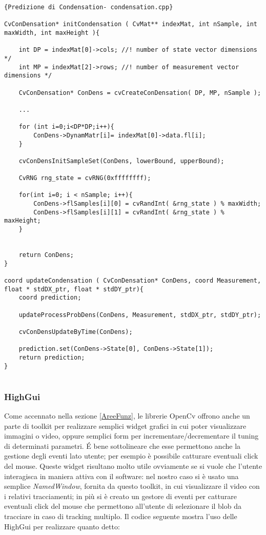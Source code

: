 \lstset{language=c++}
\lstset{commentstyle=\emph}
\begin{lstlisting}[frame=r,caption=Predizione di Condensation- condensation.cpp ,breaklines=true,basicstyle=\small]{Predizione di Condensation- condensation.cpp}

CvConDensation* initCondensation ( CvMat** indexMat, int nSample, int maxWidth, int maxHeight ){
	
	int DP = indexMat[0]->cols; //! number of state vector dimensions */
	int MP = indexMat[2]->rows; //! number of measurement vector dimensions */

	CvConDensation* ConDens = cvCreateConDensation( DP, MP, nSample );
	
	...

	for (int i=0;i<DP*DP;i++){
		ConDens->DynamMatr[i]= indexMat[0]->data.fl[i];
	}

	cvConDensInitSampleSet(ConDens, lowerBound, upperBound);
	
	CvRNG rng_state = cvRNG(0xffffffff);
	
	for(int i=0; i < nSample; i++){
		ConDens->flSamples[i][0] = cvRandInt( &rng_state ) % maxWidth;
		ConDens->flSamples[i][1] = cvRandInt( &rng_state ) % maxHeight;
	}

	
	return ConDens;
}

coord updateCondensation ( CvConDensation* ConDens, coord Measurement, float * stdDX_ptr, float * stdDY_ptr){
	coord prediction;
	
	updateProcessProbDens(ConDens, Measurement, stdDX_ptr, stdDY_ptr);
	
	cvConDensUpdateByTime(ConDens);
	
	prediction.set(ConDens->State[0], ConDens->State[1]);
	return prediction;	
}


\end{lstlisting}

\newpage
\subsubsection{HighGui}
Come accennato nella sezione \ref{AreeFunz}, le librerie OpenCv offrono anche un parte di toolkit per realizzare semplici widget grafici in cui poter visualizzare immagini o video, oppure semplici form per incrementare/decrementare il tuning di determinati parametri. \'E bene sottolineare che esse permettono anche la gestione degli eventi lato utente; per esempio è possibile catturare eventuali click del mouse. Queste widget risultano molto utile ovviamente se si vuole che l'utente interagisca in maniera attiva con il software: nel nostro caso si è usato una semplice \textit{NamedWindow}, fornita da questo toolkit, in cui visualizzare il video con i relativi tracciamenti; in più si è creato un gestore di eventi per catturare eventuali click del mouse che permettono all'utente di selezionare il blob da tracciare in caso di tracking multiplo.
Il codice seguente mostra l'uso delle HighGui per realizzare quanto detto:

